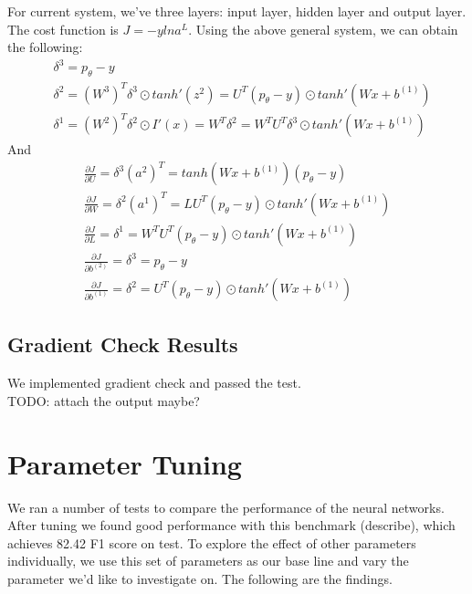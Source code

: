 \documentclass[11pt, oneside]{article}   	%
\begin{document}
For current system, we've three layers: input layer, hidden layer and output layer. The cost function is $J = - y lna^L$. Using the above general system, we can obtain the following:
\begin{subequations}
\begin{align}
& \delta^3 =  p_{\theta} - y\\
& \delta^2 = (W^3)^T \delta^3 \odot tanh'(z^2) = U^T (p_{\theta} - y)  \odot tanh'(Wx + b^{(1)}) \\
& \delta^1 = (W^2)^T \delta^2  \odot I'(x)= W^T \delta^2 = W^T U^T \delta^3 \odot tanh'(Wx + b^{(1)})
\end{align}
\end{subequations}
And
\begin{subequations}
\begin{align}
\frac{\partial J}{ \partial U} = \delta^3 (a^2 )^T = tanh(Wx + b^{(1)}) (p_{\theta} - y) \\
\frac{\partial J}{ \partial W} = \delta^2 (a^1 )^T = LU^T(p_{\theta} - y) \odot tanh'(Wx + b^{(1)}) \\
\frac{\partial J}{ \partial L} =  \delta^1 = W^T U^T (p_{\theta} - y) \odot tanh'(Wx + b^{(1)})  \\
\frac{\partial J}{ \partial b^{(2)}} = \delta^3 = p_{\theta} - y \\
\frac{\partial J}{ \partial b^{(1)}} = \delta^2 = U^T(p_{\theta} - y) \odot tanh'(Wx + b^{(1)}) 
\end{align}
\end{subequations}



\subsection{Gradient Check Results}
We implemented gradient check and passed the test. 
\\TODO: attach the output maybe? 


\section{Parameter Tuning}
We ran a number of tests to compare the performance of the neural networks. After tuning we found good performance with this benchmark (describe), which achieves 82.42 F1 score on test. To explore the effect of other parameters individually, we use this set of parameters as our base line and vary the parameter we'd like to investigate on. The following are the findings. 
\end{document}
